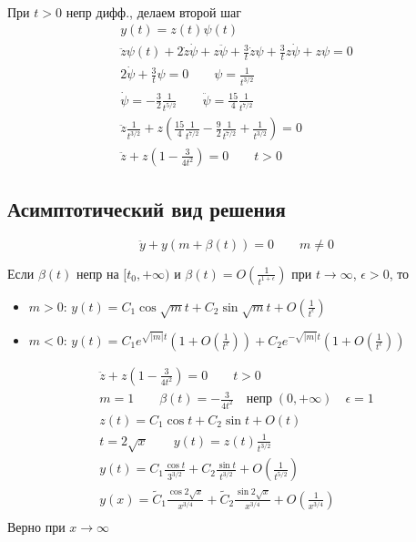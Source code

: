 \documentclass{article}
\begin{document}
\begin{enumerate}
\begin{enumerate}
\begin{eg}
\begin{gather*}
        \end{gather*}
        При $t>0$ непр дифф., делаем второй шаг
        \begin{gather*}
          y(t)=z(t)\psi(t) \\ 
          \ddot z \psi(t)+2 \dot{z}\dot{\psi} + z \ddot \psi + \frac{3}{t}\dot{z}\psi+\frac{3}{t}z\dot{\psi}+z\psi =0 \\
          2\dot{\psi}+\frac{3}{t}\psi = 0 \qquad \psi=\frac{1}{t^{3/2}} \\ 
          \dot{\psi} = -\frac{3}{2}\frac{1}{t^{5/2}} \qquad \ddot \psi=\frac{15}{4}\frac{1}{t^{7/2}} \\ 
          \ddot z \frac{1}{t^{3/2}}+z\left(\frac{15}{4}\frac{1}{t^{7/2}}-\frac{9}{2}\frac{1}{t^{7/2}}+\frac{1}{t^{3/2}}\right)=0 \\ 
          \ddot z + z\left(1-\frac{3}{4t^{2}}\right)=0 \qquad t>0
        \end{gather*}
      \end{eg}
    \end{enumerate}
\end{enumerate}

\subsection{Асимптотический вид решения}
\[
  \ddot y + y(m+\beta(t))=0 \qquad m \neq 0
\]
\begin{theorem}
  Если $\beta(t)$ непр на $[t_0,+\infty)$ и $\beta(t)=O(\frac{1}{t^{1+\epsilon}})$ при $t\to\infty$, $\epsilon>0$, то 
  \begin{itemize}
    \item $m>0$: $y(t)=C_1\cos\sqrt{m}t+C_2\sin \sqrt{m}t+O(\frac{1}{t^{\epsilon}})$
    \item $m<0$: $y(t)=C_1e^{\sqrt{|m|}t}\left(1+O(\frac{1}{t^{\epsilon}})\right) + C_2e^{-\sqrt{|m|}t}\left(1+O(\frac{1}{t^{\epsilon}})\right)$
  \end{itemize}
\end{theorem}
\begin{eg}
  \begin{gather*}
    \ddot z + z\left(1-\frac{3}{4t^{2}}\right)=0 \qquad t>0 \\ 
    m=1 \qquad \beta(t)=-\frac{3}{4t^{2}} \quad \text{непр} \; (0,+\infty) \quad \epsilon=1 \\ 
    z(t)=C_1\cos t + C_2\sin t +O(t) \\ 
    t=2\sqrt{x} \qquad y(t)=z(t)\frac{1}{t^{3/2}} \\
    y(t)=C_1\frac{\cos t }{3^{3/2}}+C_2\frac{\sin t}{t^{3/2}}+O\left(\frac{1}{t^{5/2}}\right) \\ 
    y(x)=\tilde C_1 \frac{\cos 2\sqrt{x}}{x^{3/4}}+ \tilde C_2 \frac{\sin 2\sqrt{x}}{x^{3/4}} + O\left(\frac{1}{x^{3/4}}\right) \\ 
  \end{gather*} 
  Верно при $x\to \infty$
\end{eg}
\end{document}
